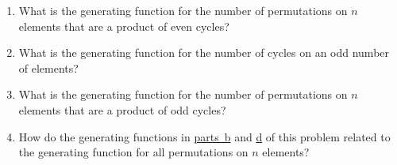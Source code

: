\documentclass[10pt,]{book}
\theoremstyle{plain}
\theoremstyle{definition}
\theoremstyle{definition}
\numberwithin{equation}{chapter}
\begin{document}
\begin{exerciselist}
\begin{enumerate}[label=(\alph*)]
\item\hypertarget{EGF-perm-even-cycles}{}\hypertarget{p-2230}{}%
What is the generating function for the number of permutations on \(n\) elements that are a product of even cycles?%
\item\hypertarget{li-142}{}\hypertarget{p-2231}{}%
What is the generating function for the number of cycles on an odd number of elements?%
\item\hypertarget{EGF-perm-odd-cycles}{}\hypertarget{p-2232}{}%
What is the generating function for the number of permutations on \(n\) elements that are a product of odd cycles?%
\item\hypertarget{li-144}{}\hypertarget{p-2233}{}%
How do the generating functions in \hyperlink{EGF-perm-even-cycles}{parts~b} and \hyperlink{EGF-perm-odd-cycles}{d} of this problem related to the generating function for all permutations on \(n\) elements?%
\end{enumerate}
%
\par\smallskip
\end{exerciselist}
\typeout{************************************************}
\typeout{************************************************}
\end{document}
